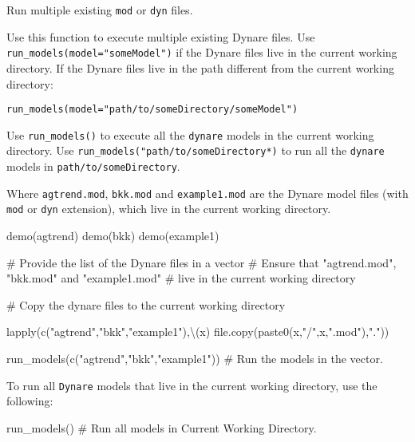 \documentclass[
  letterpaper,
  DIV=11,
  numbers=noendperiod]{scrartcl}
\newenvironment{Shaded}{\begin{snugshade}}{\end{snugshade}}
\newcommand{\CommentTok}[1]{\textcolor[rgb]{0.37,0.37,0.37}{#1}}
\newcommand{\FunctionTok}[1]{\textcolor[rgb]{0.28,0.35,0.67}{#1}}
\newcommand{\NormalTok}[1]{\textcolor[rgb]{0.00,0.23,0.31}{#1}}
\newcommand{\StringTok}[1]{\textcolor[rgb]{0.13,0.47,0.30}{#1}}
\begin{document}
Run multiple existing \texttt{mod} or \texttt{dyn} files.

Use this function to execute multiple existing Dynare files. Use
\texttt{run\_models(model="someModel")} if the Dynare files live in the
current working directory. If the Dynare files live in the path
different from the current working directory:

\texttt{run\_models(model="path/to/someDirectory/someModel")}

Use \texttt{run\_models()} to execute all the \texttt{dynare} models in
the current working directory. Use
\texttt{run\_models("path/to/someDirectory*)} to run all the
\texttt{dynare} models in \texttt{path/to/someDirectory}.

Where \texttt{agtrend.mod}, \texttt{bkk.mod} and \texttt{example1.mod}
are the Dynare model files (with \texttt{mod} or \texttt{dyn}
extension), which live in the current working directory.

\begin{Shaded}
\begin{Highlighting}[]
\FunctionTok{demo}\NormalTok{(agtrend)}
\FunctionTok{demo}\NormalTok{(bkk)}
\FunctionTok{demo}\NormalTok{(example1)}

\CommentTok{\# Provide the list of the \textasciigrave{}Dynare\textasciigrave{} files in a vector}
\CommentTok{\# Ensure that "agtrend.mod", "bkk.mod" and "example1.mod"}
\CommentTok{\# live in the current working directory}

\CommentTok{\# Copy the dynare files to the current working directory}

\FunctionTok{lapply}\NormalTok{(}\FunctionTok{c}\NormalTok{(}\StringTok{"agtrend"}\NormalTok{,}\StringTok{"bkk"}\NormalTok{,}\StringTok{"example1"}\NormalTok{),\textbackslash{}(x) }\FunctionTok{file.copy}\NormalTok{(}\FunctionTok{paste0}\NormalTok{(x,}\StringTok{"/"}\NormalTok{,x,}\StringTok{".mod"}\NormalTok{),}\StringTok{"."}\NormalTok{))}

\FunctionTok{run\_models}\NormalTok{(}\FunctionTok{c}\NormalTok{(}\StringTok{"agtrend"}\NormalTok{,}\StringTok{"bkk"}\NormalTok{,}\StringTok{"example1"}\NormalTok{)) }\CommentTok{\# Run the models in the vector.}
\end{Highlighting}
\end{Shaded}

To run all \texttt{Dynare} models that live in the current working
directory, use the following:

\begin{Shaded}
\begin{Highlighting}[]
\FunctionTok{run\_models}\NormalTok{() }\CommentTok{\# Run all models in Current Working Directory.}
\end{Highlighting}
\end{Shaded}
\end{document}
